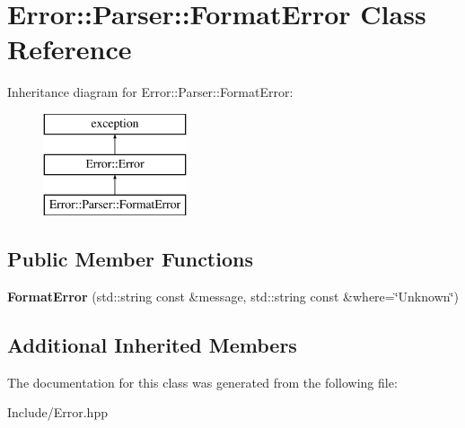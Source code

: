 \hypertarget{classError_1_1Parser_1_1FormatError}{}\section{Error\+:\+:Parser\+:\+:Format\+Error Class Reference}
\label{classError_1_1Parser_1_1FormatError}
Inheritance diagram for Error\+:\+:Parser\+:\+:Format\+Error\+:\begin{figure}[H]
\begin{center}
\leavevmode
\includegraphics[height=3.000000cm]{classError_1_1Parser_1_1FormatError}
\end{center}
\end{figure}
\subsection*{Public Member Functions}
\begin{DoxyCompactItemize}
\item 
\mbox{\label{classError_1_1Parser_1_1FormatError_ae27aad8b7c583d29d4bd40f23183034f}} 
{\bfseries Format\+Error} (std\+::string const \&message, std\+::string const \&where=\char`\"{}Unknown\char`\"{})
\end{DoxyCompactItemize}
\subsection*{Additional Inherited Members}


The documentation for this class was generated from the following file\+:\begin{DoxyCompactItemize}
\item 
Include/Error.\+hpp\end{DoxyCompactItemize}
